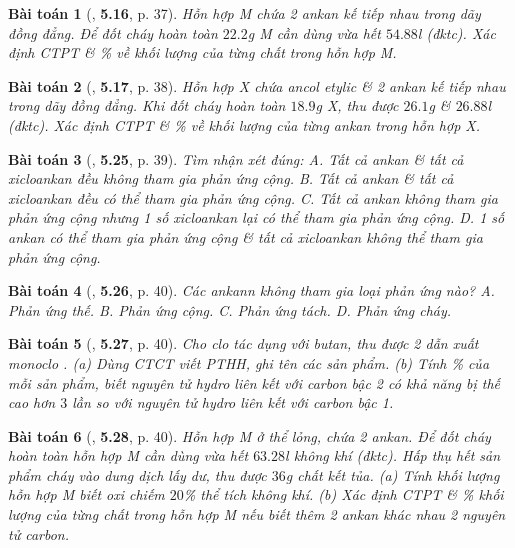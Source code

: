 \documentclass{article}
\numberwithin{equation}{section}
\newtheorem{baitoan}{Bài toán}[section]
\begin{document}
\begin{baitoan}[\cite{SBT_Hoa_Hoc_11_co_ban}, \textbf{5.16}, p. 37]
	Hỗn hợp M chứa 2 ankan kế tiếp nhau trong dãy đồng đẳng. Để đốt cháy hoàn toàn $22.2$\emph{g} M cần dùng vừa hết $54.88$\emph{l} \emph{} (đktc). Xác định CTPT \& \% về khối lượng của từng chất trong hỗn hợp M.
\end{baitoan}

\begin{baitoan}[\cite{SBT_Hoa_Hoc_11_co_ban}, \textbf{5.17}, p. 38]
	Hỗn hợp X chứa ancol etylic \emph{} \& 2 ankan kế tiếp nhau trong dãy đồng đẳng. Khi đốt cháy hoàn toàn $18.9$\emph{g} X, thu được $26.1$\emph{g } \& $26.88$\emph{l } (đktc). Xác định CTPT \& \% về khối lượng của từng ankan trong hỗn hợp X.
\end{baitoan}

\begin{baitoan}[\cite{SBT_Hoa_Hoc_11_co_ban}, \textbf{5.25}, p. 39]
	Tìm nhận xét đúng: {\sf A.} Tất cả ankan \& tất cả xicloankan đều không tham gia phản ứng cộng. {\sf B.} Tất cả ankan \& tất cả xicloankan đều có thể tham gia phản ứng cộng. {\sf C.} Tất cả ankan không tham gia phản ứng cộng nhưng 1 số xicloankan lại có thể tham gia phản ứng cộng. {\sf D.} 1 số ankan có thể tham gia phản ứng cộng \& tất cả xicloankan không thể tham gia phản ứng cộng.
\end{baitoan}

\begin{baitoan}[\cite{SBT_Hoa_Hoc_11_co_ban}, \textbf{5.26}, p. 40]
	Các ankann không tham gia loại phản ứng nào? {\sf A.} Phản ứng thế. {\sf B.} Phản ứng cộng. {\sf C.} Phản ứng tách. {\sf D.} Phản ứng cháy.
\end{baitoan}

\begin{baitoan}[\cite{SBT_Hoa_Hoc_11_co_ban}, \textbf{5.27}, p. 40]
	Cho clo tác dụng với butan, thu được 2 dẫn xuất monoclo \emph{}. (a) Dùng CTCT viết PTHH, ghi tên các sản phẩm. (b) Tính \% của mỗi sản phẩm, biết nguyên tử hydro liên kết với carbon bậc 2 có khả năng bị thế cao hơn $3$ lần so với nguyên tử hydro liên kết với carbon bậc 1.
\end{baitoan}

\begin{baitoan}[\cite{SBT_Hoa_Hoc_11_co_ban}, \textbf{5.28}, p. 40]
	Hỗn hợp M ở thể lỏng, chứa 2 ankan. Để đốt cháy hoàn toàn hỗn hợp M cần dùng vừa hết $63.28$\emph{l} không khí (đktc). Hấp thụ hết sản phẩm cháy vào dung dịch \emph{} lấy dư, thu được $36$\emph{g} chất kết tủa. (a) Tính khối lượng hỗn hợp M biết oxi chiếm $20$\% thể tích không khí. (b) Xác định CTPT \& \% khối lượng của từng chất trong hỗn hợp M nếu biết thêm 2 ankan khác nhau 2 nguyên tử carbon.
\end{baitoan}
\end{document}
